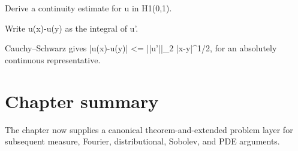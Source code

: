 \begin{exercise}\label{exr:iii21-expand-16}
Derive a continuity estimate for u in H1(0,1).
\end{exercise}
\begin{hint}
Write u(x)-u(y) as the integral of u'.
\end{hint}
\begin{solution}
Cauchy--Schwarz gives |u(x)-u(y)| <= ||u'||\_2 |x-y|\textasciicircum{}{1/2}, for an absolutely continuous representative.
\end{solution}
\section*{Chapter summary}
The chapter now supplies a canonical theorem-and-extended problem layer for subsequent measure, Fourier, distributional, Sobolev, and PDE arguments.
